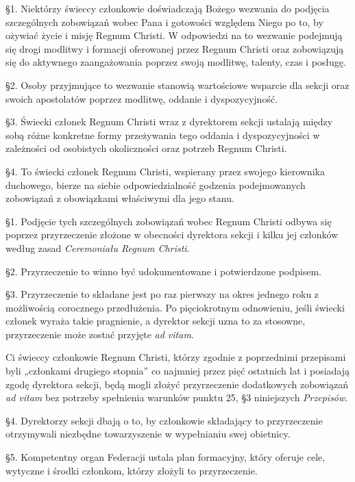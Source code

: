  \S{}1. Niektórzy świeccy członkowie doświadczają Bożego wezwania do podjęcia szczególnych zobowiązań wobec Pana i gotowości względem Niego po to, by ożywiać życie i misję Regnum Christi. W odpowiedzi na to wezwanie podejmują się drogi modlitwy i formacji oferowanej przez Regnum Christi oraz zobowiązują się do aktywnego zaangażowania poprzez swoją modlitwę, talenty, czas i posługę.

\S{}2. Osoby przyjmujące to wezwanie stanowią wartościowe wsparcie dla sekcji oraz swoich apostolatów poprzez modlitwę, oddanie i dyspozycyjność.

\S{}3. Świecki członek Regnum Christi wraz z dyrektorem sekcji ustalają między sobą różne konkretne formy przeżywania tego oddania i dyspozycyjności w zależności od osobistych okoliczności oraz potrzeb Regnum Christi.

\S{}4. To świecki członek Regnum Christi, wspierany przez swojego kierownika duchowego, bierze na siebie odpowiedzialność godzenia podejmowanych zobowiązań z obowiązkami właściwymi dla jego stanu.

 \S{}1. Podjęcie tych szczególnych zobowiązań wobec Regnum Christi odbywa się poprzez przyrzeczenie złożone w obecności dyrektora sekcji i kilku jej członków według zasad {\em Ceremoniału Regnum Christi}.

\S{}2. Przyrzeczenie to winno być udokumentowane i potwierdzone podpisem.

\S{}3. Przyrzeczenie to składane jest po raz pierwszy na okres jednego roku z możliwością corocznego przedłużenia. Po pięciokrotnym odnowieniu, jeśli świecki członek wyraża takie pragnienie, a dyrektor sekcji uzna to za stosowne, przyrzeczenie może zostać przyjęte {\em ad vitam}.


Ci świeccy członkowie Regnum Christi, którzy zgodnie z poprzednimi przepisami byli „członkami drugiego stopnia” co najmniej przez pięć ostatnich lat i posiadają zgodę dyrektora sekcji, będą mogli złożyć przyrzeczenie dodatkowych zobowiązań {\em ad vitam} bez potrzeby spełnienia warunków punktu 25, \S{}3 niniejszych {\em Przepisów}.

\S{}4. Dyrektorzy sekcji dbają o to, by członkowie składający to przyrzeczenie otrzymywali niezbędne towarzyszenie w wypełnianiu swej obietnicy.

\S{}5. Kompetentny organ Federacji ustala plan formacyjny, który oferuje cele, wytyczne i środki członkom, którzy złożyli to przyrzeczenie.

